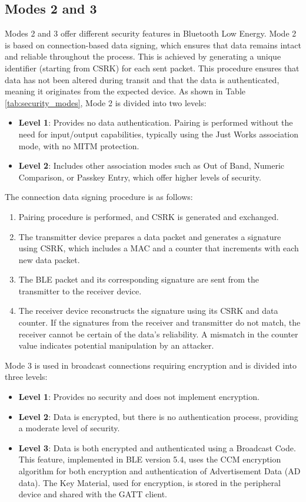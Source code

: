 \documentclass{Configuration_Files/PoliMi3i_thesis}
\begin{document}
\subsection{Modes 2 and 3}

Modes 2 and 3 offer different security features in Bluetooth Low Energy. Mode 2 is based on connection-based data signing, which ensures that data remains intact and reliable throughout the process. This is achieved by generating a unique identifier (starting from CSRK) for each sent packet. This procedure ensures that data has not been altered during transit and that the data is authenticated, meaning it originates from the expected device. As shown in Table \ref{tab:security_modes}, Mode 2 is divided into two levels:

\begin{itemize}
    \item \textbf{Level 1}: Provides no data authentication. Pairing is performed without the need for input/output capabilities, typically using the Just Works association mode, with no MITM protection.
    \item \textbf{Level 2}: Includes other association modes such as Out of Band, Numeric Comparison, or Passkey Entry, which offer higher levels of security.
\end{itemize}

The connection data signing procedure is as follows:
\begin{enumerate}
    \item Pairing procedure is performed, and CSRK is generated and exchanged.
    \item The transmitter device prepares a data packet and generates a signature using CSRK, which includes a MAC and a counter that increments with each new data packet.
    \item The BLE packet and its corresponding signature are sent from the transmitter to the receiver device.
    \item The receiver device reconstructs the signature using its CSRK and data counter. If the signatures from the receiver and transmitter do not match, the receiver cannot be certain of the data's reliability. A mismatch in the counter value indicates potential manipulation by an attacker.
\end{enumerate}

Mode 3 is used in broadcast connections requiring encryption and is divided into three levels:
\begin{itemize}
    \item \textbf{Level 1}: Provides no security and does not implement encryption.
    \item \textbf{Level 2}: Data is encrypted, but there is no authentication process, providing a moderate level of security.
    \item \textbf{Level 3}: Data is both encrypted and authenticated using a Broadcast Code. This feature, implemented in BLE version 5.4, uses the CCM encryption algorithm for both encryption and authentication of Advertisement Data (AD data). The Key Material, used for encryption, is stored in the peripheral device and shared with the GATT client.
\end{itemize}
\end{document}
